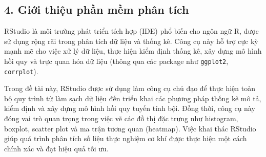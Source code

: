 \subsection{4. Giới thiệu phần mềm phân tích}
RStudio là môi trường phát triển tích hợp (IDE) phổ biến cho ngôn ngữ R, được sử dụng rộng rãi trong phân tích dữ liệu và thống kê. Công cụ này hỗ trợ cực kỳ mạnh mẽ cho việc xử lý dữ liệu, thực hiện kiểm định thống kê, xây dựng mô hình hồi quy và trực quan hóa dữ liệu (thông qua các package như \texttt{ggplot2}, \texttt{corrplot}).

Trong đề tài này, RStudio được sử dụng làm công cụ chủ đạo để thực hiện toàn bộ quy trình từ làm sạch dữ liệu đến triển khai các phương pháp thống kê mô tả, kiểm định và xây dựng mô hình hồi quy tuyến tính bội. Đồng thời, công cụ này đóng vai trò quan trọng trong việc vẽ các đồ thị đặc trưng như histogram, boxplot, scatter plot và ma trận tương quan (heatmap). Việc khai thác RStudio giúp quá trình phân tích số liệu thực nghiệm cơ khí được thực hiện một cách chính xác và đạt hiệu quả tối ưu.